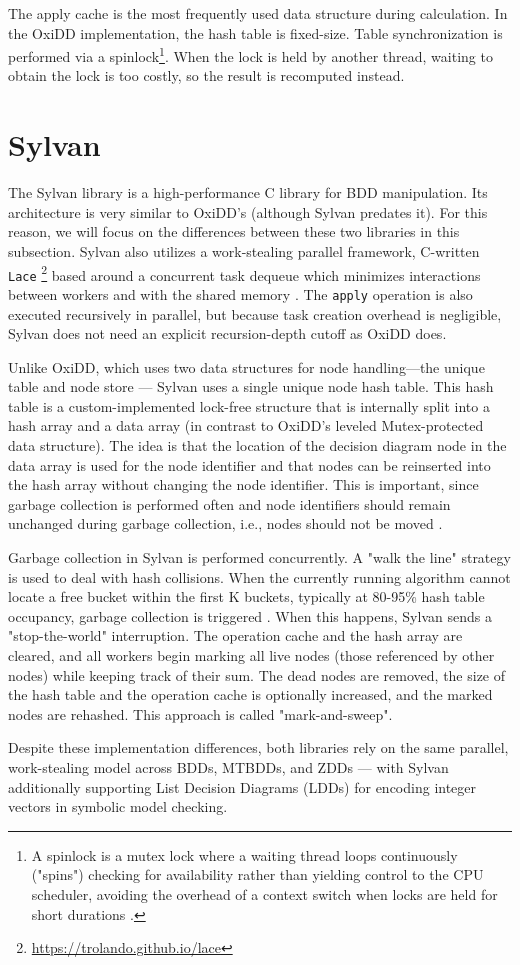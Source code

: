 The apply cache is the most frequently used data structure during calculation. In the OxiDD implementation, the hash
table is fixed-size. Table synchronization is performed via a spinlock\footnote{A spinlock is a mutex lock where a
waiting thread loops continuously ("spins") checking for availability rather than yielding control to the CPU
scheduler, avoiding the overhead of a context switch when locks are held for short durations \cite{os-concepts}.}.
When the lock is held by another thread, waiting to obtain the lock is too costly, so the result is recomputed
instead.


\section{Sylvan}
\label{chap:other-impls:sylvan}

The Sylvan library is a high-performance C library for BDD manipulation. Its architecture is very similar to OxiDD's
(although Sylvan predates it). For this reason, we will focus on the differences between these two libraries in this
subsection. Sylvan also utilizes a work-stealing parallel framework, C-written \texttt{Lace}
\footnote{\url{https://trolando.github.io/lace}} based around a concurrent task dequeue which minimizes interactions
between workers and with the shared memory \cite{sylvan, sylvan-thesis}. The \texttt{apply} operation is also
executed recursively in parallel, but because task creation overhead is negligible, Sylvan does not need an explicit
recursion-depth cutoff as OxiDD does.

Unlike OxiDD, which uses two data structures for node handling—the unique table and node store --- Sylvan uses a
single unique node hash table. This hash table is a custom-implemented lock-free structure that is internally split
into a hash array and a data array (in contrast to OxiDD's leveled Mutex-protected data structure). The idea is that
the location of the decision diagram node in the data array is used for the node identifier and that nodes can be
reinserted into the hash array without changing the node identifier. This is important, since garbage collection is
performed often and node identifiers should remain unchanged during garbage collection, i.e., nodes should not be
moved \cite{sylvan}.

Garbage collection in Sylvan is performed concurrently. A "walk the line" strategy
\cite[subsec. 4.2.1]{sylvan-thesis} is used to deal with hash collisions. When the currently running algorithm cannot
locate a free bucket within the first K buckets, typically at 80-95\% hash table occupancy, garbage collection is
triggered \cite{sylvan}. When this happens, Sylvan sends a "stop-the-world" interruption. The operation cache and the
hash array are cleared, and all workers begin marking all live nodes (those referenced by other nodes) while keeping
track of their sum. The dead nodes are removed, the size of the hash table and the operation cache is optionally
increased, and the marked nodes are rehashed. This approach is called "mark-and-sweep".

Despite these implementation differences, both libraries rely on the same parallel, work-stealing model across BDDs,
MTBDDs, and ZDDs --- with Sylvan additionally supporting List Decision Diagrams (LDDs) for encoding integer vectors
in symbolic model checking.

